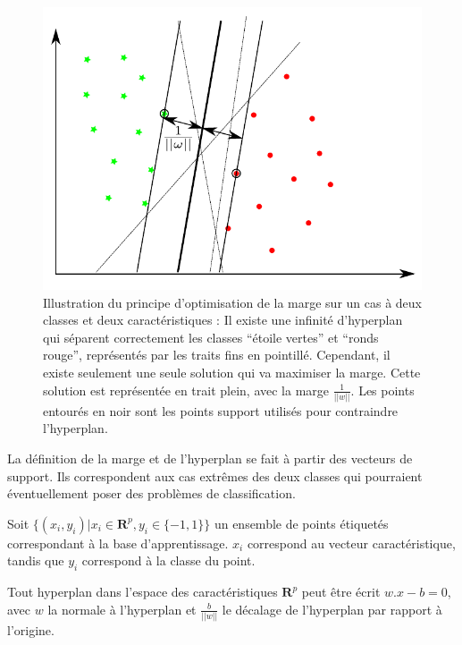 \begin{figure}[h]
	\label{fig:multiPlansSeparationSVM}
	\begin{center}
	\includegraphics[width=15cm]{images/multiPlansSeparationSVM}
	\end{center}
	\caption[Illustration du principe d'optimisation de la marge sur le SVM]{Illustration du principe d'optimisation de la marge sur un cas à deux classes et deux caractéristiques : Il existe une infinité d'hyperplan qui séparent correctement les classes ``étoile vertes'' et ``ronds rouge'', représentés par les traits fins en pointillé. Cependant, il existe seulement une seule solution qui va maximiser la marge. Cette solution est représentée en trait plein, avec la marge $\frac{1}{||w||}$. Les points entourés en noir sont les points support utilisés pour contraindre l'hyperplan. }
\end{figure}


La définition de la marge et de l'hyperplan se fait à partir des vecteurs de support. Ils correspondent aux cas extrêmes des deux classes qui pourraient éventuellement poser des problèmes de classification.


Soit $\{(x_i, y_i) | x_i \in \mathbf{R}^p , y_i \in \{ -1, 1 \} \}$ un ensemble de points étiquetés correspondant à la base d'apprentissage. $x_i$ correspond au vecteur caractéristique, tandis que $y_i$ correspond à la classe du point.

Tout hyperplan dans l'espace des caractéristiques $\mathbf{R}^p$ peut être écrit $w . x - b = 0$, avec $w$ la normale à l'hyperplan et $\frac{b}{ ||w|| }$ le décalage de l'hyperplan par rapport à l'origine. 

